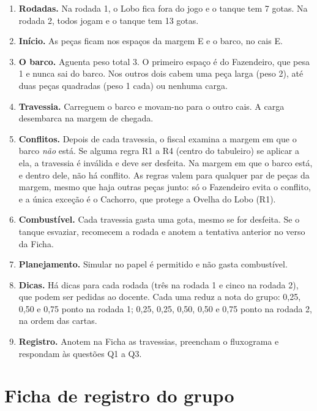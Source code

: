 \documentclass[12pt,a4paper]{article}
\begin{document}
\begin{tcolorbox}[colback=white,colframe=blue!50!black,coltitle=white,
  colbacktitle=blue!50!black,title={\bfseries Travessia do Rio},
  boxrule=1pt,arc=3mm,fontupper=\small\setstretch{1.12}]
\smallskip
\begin{enumerate}[leftmargin=*,label=\textbf{\arabic*.},itemsep=4pt]
  \item \textbf{Rodadas.} Na rodada 1, o Lobo fica fora do jogo e o tanque tem
        7 gotas. Na rodada 2, todos jogam e o tanque tem 13 gotas.
  \item \textbf{Início.} As peças ficam nos espaços da margem E e o barco, no
        cais E.
  \item \textbf{O barco.} Aguenta peso total 3. O primeiro espaço é do
        Fazendeiro, que pesa 1 e nunca sai do barco. Nos outros dois cabem uma
        peça larga (peso 2), até duas peças quadradas (peso 1 cada) ou nenhuma
        carga.
  \item \textbf{Travessia.} Carreguem o barco e movam-no para o outro cais. A
        carga desembarca na margem de chegada.
  \item \textbf{Conflitos.} Depois de cada travessia, o fiscal examina a margem
        em que o barco \emph{não} está. Se alguma regra R1 a R4 (centro do
        tabuleiro) se aplicar a ela, a travessia é inválida e deve ser
        desfeita. Na margem em que o barco está, e dentro dele, não há
        conflito. As regras valem para qualquer par de peças da margem, mesmo
        que haja outras peças junto: só o Fazendeiro evita o conflito, e a
        única exceção é o Cachorro, que protege a Ovelha do Lobo (R1).
  \item \textbf{Combustível.} Cada travessia gasta uma gota, mesmo se for
        desfeita. Se o tanque esvaziar, recomecem a rodada e anotem a tentativa
        anterior no verso da Ficha.
  \item \textbf{Planejamento.} Simular no papel é permitido e não gasta
        combustível.
  \item \textbf{Dicas.} Há dicas para cada rodada (três na rodada 1 e cinco na
        rodada 2), que podem ser pedidas ao docente. Cada uma reduz a nota do
        grupo: 0,25, 0,50 e 0,75 ponto na rodada 1; 0,25, 0,25, 0,50, 0,50 e
        0,75 ponto na rodada 2, na ordem das cartas.
  \item \textbf{Registro.} Anotem na Ficha as travessias, preencham o
        fluxograma e respondam às questões Q1 a Q3.
\end{enumerate}
\end{tcolorbox}

\clearpage

\section{Ficha de registro do grupo}
\end{document}
